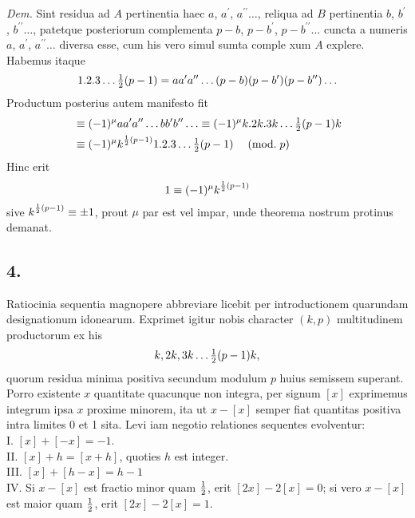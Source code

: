 \documentclass[twoside,12pt]{memoir}
\renewcommand{\pmod}[1]{\;(\textrm{mod.}\;#1)}
\let\oldfrac\frac
\def\frac#1#2{\mathchoice{\tfrac{#1}{#2}}{\oldfrac{#1}{#2}}{\genfrac{}{}{}{2}{#1}{#2\mathstrut}}{\genfrac{}{}{}{3}{#1}{#2\mathstrut}}}
\begin{document}
\textit{Dem.} Sint residua ad \(A\) pertinentia haec \(a\), \(a^{\prime}\), \(a^{\prime \prime} \ldots\), reliqua ad \(B\) pertinentia \(b\), \(b^{\prime}\), \(b^{\prime \prime} \ldots\), patetque posteriorum complementa \(p-b\), \(p-b^{\prime}\), \(p-b^{\prime \prime} \ldots\) cuncta a numeris \(a\), \(a^{\prime}\), \(a^{\prime \prime} \ldots\) diversa esse, cum his vero simul sumta comple\pagebreak%
xum \({A}\) explere. Habemus itaque
\[1 . 2 . 3 \ldots \frac{1}{2}(p-1)=a a^{\prime} a^{\prime \prime} \ldots(p-b)(p-b^{\prime})(p-b^{\prime \prime}) \ldots\]
Productum posterius autem manifesto fit
\[\begin{aligned}
& \equiv(-1)^{\mu} a a^{\prime} a^{\prime \prime} \ldots b b^{\prime} b^{\prime \prime} \ldots \equiv(-1)^{\mu} k . 2 k .3 k \ldots \frac{1}{2}(p-1) k \\
& \equiv(-1)^{\mu} k^{\frac{1}{2}(p-1)} 1.2 .3 \ldots \frac{1}{2}(p-1) \quad\pmod{p}
\end{aligned}\]
Hinc erit
\[1 \equiv(-1)^{\mu} k^{\frac{1}{2}(p-1)}\]
sive \(k^{\frac{1}{2}(p-1)} \equiv \pm 1\), prout \(\mu\) par est vel impar, unde theorema nostrum protinus demanat.

\subsection*{4.}
 
Ratiocinia sequentia magnopere abbreviare licebit per introductionem quarundam designationum idonearum. Exprimet igitur nobis character \((k, p)\) multitudinem productorum ex his
\[k, 2 k, 3 k \ldots \frac{1}{2}(p-1) k,\]
quorum residua minima positiva secundum modulum \(p\) huius semissem superant. Porro existente \(x\) quantitate quacunque non integra, per signum \([x]\) exprimemus integrum ipsa \(x\) proxime minorem, ita ut \(x-[x]\) semper fiat quantitas positiva intra limites \(0\) et 1 sita. Levi iam negotio relationes sequentes evolventur:\\
 
I. \([x]+[-x]=-1\).\\
 
II. \([x]+h =[x+h]\), quoties \(h\) est integer.\\
 
III. \([x]+[h-x]=h-1\)\\
 
IV. Si \(x-[x]\) est fractio minor quam \(\frac{1}{2}\), erit \([2 x]-2[x]=0\); si vero \(x-[x]\) est maior quam \(\frac{1}{2}\), erit \([2 x]-2[x]=1\).\\
 
\end{document}
